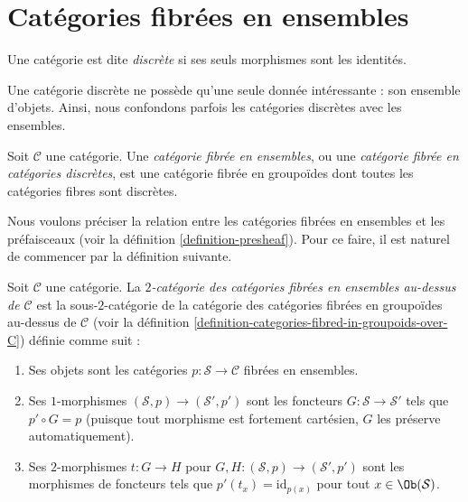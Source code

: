 \section{Catégories fibrées en ensembles}
\label{section-fibred-in-sets}

\begin{definition}
\label{definition-discrete}
Une catégorie est dite {\it discrète} si ses seuls morphismes sont les
identités.
\end{definition}

\noindent
Une catégorie discrète ne possède qu'une seule donnée intéressante :
son ensemble d'objets. Ainsi, nous confondons parfois les catégories discrètes
avec les ensembles.

\begin{definition}
\label{definition-category-fibred-sets}
Soit $\mathcal{C}$ une catégorie.
Une {\it catégorie fibrée en ensembles}, ou une {\it catégorie fibrée
en catégories discrètes}, est une catégorie fibrée en groupoïdes dont
toutes les catégories fibres sont discrètes.
\end{definition}

\noindent
Nous voulons préciser la relation entre les catégories fibrées en ensembles
et les préfaisceaux (voir la définition \ref{definition-presheaf}).
Pour ce faire, il est naturel de commencer par la définition suivante.

\begin{definition}
\label{definition-categories-fibred-in-sets-over-C}
Soit $\mathcal{C}$ une catégorie.
La {\it $2$-catégorie des catégories fibrées en ensembles au-dessus de
$\mathcal{C}$} est la sous-$2$-catégorie de la catégorie des catégories
fibrées en groupoïdes au-dessus de $\mathcal{C}$ (voir la
définition \ref{definition-categories-fibred-in-groupoids-over-C})
définie comme suit :
\begin{enumerate}
\item Ses objets sont les catégories
$p : \mathcal{S} \to \mathcal{C}$ fibrées en ensembles.
\item Ses $1$-morphismes $(\mathcal{S}, p) \to (\mathcal{S}', p')$
sont les foncteurs $G : \mathcal{S} \to \mathcal{S}'$ tels que
$p' \circ G = p$ (puisque tout morphisme est fortement cartésien,
$G$ les préserve automatiquement).
\item Ses $2$-morphismes $t : G \to H$ pour
$G, H : (\mathcal{S}, p) \to (\mathcal{S}', p')$
sont les morphismes de foncteurs
tels que $p'(t_x) = \text{id}_{p(x)}$
pour tout $x \in \Ob(\mathcal{S})$.
\end{enumerate}
\end{definition}

